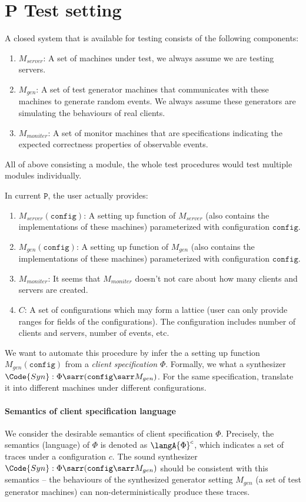 \section{P Test setting}

A closed system that is available for testing consists of the following components:
\begin{enumerate}
    \item $M_{server}$: A set of machines under test, we always assume we are testing servers.
    \item $M_{gen}$: A set of test generator machines that communicates with these machines to generate random events. We always assume these generators are simulating the behaviours of real clients.
    \item $M_{moniter}$: A set of monitor machines that are specifications indicating the expected correctness properties of observable events.
\end{enumerate}
All of above consisting a module, the whole test procedures would test multiple modules individually.

In current $\mathtt{P}$, the user actually provides:
\begin{enumerate}
    \item $M_{server}(\mathtt{config})$: A setting up function of $M_{server}$ (also contains the implementations of these machines) parameterized with configuration $\mathtt{config}$.
    \item $M_{gen}(\mathtt{config})$: A setting up function of $M_{gen}$ (also contains the implementations of these machines) parameterized with configuration $\mathtt{config}$.
    \item $M_{moniter}$: It seems that $M_{moniter}$ doesn't not care about how many clients and servers are created.
    \item $C$: A set of configurations which may form a lattice (user can only provide ranges for fields of the configurations). The configuration includes number of clients and servers, number of events, etc.
\end{enumerate}

We want to automate this procedure by infer the a setting up function $M_{gen}(\mathtt{config})$ from a \emph{client specification} $\Phi$. Formally, we what a synthesizer $\Code{Syn}:\Phi \sarr (\mathtt{config} \sarr  M_{gen})$. For the same specification, translate it into different machines under different configurations.

\paragraph{Semantics of client specification language} We consider the desirable semantics of client specification $\Phi$. Precisely, the semantics (language) of $\Phi$ is denoted as $\langA{\Phi}^c$, which indicates a set of traces under a configuration $c$. The sound synthesizer $\Code{Syn}:\Phi \sarr (\mathtt{config} \sarr  M_{gen})$ should be consistent with this semantics -- the behaviours of the synthesized generator setting $M_{gen}$ (a set of test generator machines) can non-deterministically produce these traces. 

